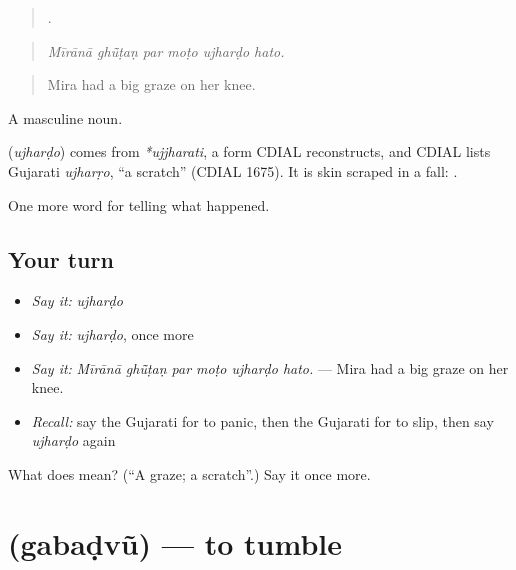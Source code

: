 \begin{quote}
     .
\end{quote}

\begin{quote}
\emph{Mīrānā ghū̃ṭaṇ par moṭo ujharḍo hato.}
\end{quote}

\begin{quote}
Mira had a big graze on her knee.
\end{quote}

A masculine noun.

\begin{cousinweb}
\textbf{} (\emph{ujharḍo}) comes from \emph{*ujjharati}, a form CDIAL reconstructs, and CDIAL lists Gujarati \emph{ujharṛo}, \textquotedblleft{}a scratch\textquotedblright{} (CDIAL 1675). It is skin scraped in a fall: \textbf{  }.
\end{cousinweb}

\begin{grammarlens}[title={What you've built}]
One more word for telling what happened.
\end{grammarlens}

\subsection*{Your turn}
\begin{itemize}
\raggedright
  \item \emph{Say it:} \emph{ujharḍo}
  \item \emph{Say it:} \emph{ujharḍo}, once more
  \item \emph{Say it:} \emph{Mīrānā ghū̃ṭaṇ par moṭo ujharḍo hato.} — Mira had a big graze on her knee.
  \item \emph{Recall:} say the Gujarati for to panic, then the Gujarati for to slip, then say \emph{ujharḍo} again
\end{itemize}

\begin{tcolorbox}[breakable,colback=teal!4,colframe=teal!35!black,title={Before you move on}]
What does  mean? (\textquotedblleft{}A graze; a scratch\textquotedblright{}.) Say it once more.
\end{tcolorbox}
\section[\texorpdfstring{\gu{ગબડવું} (gabaḍvũ)}{ગબડવું (gabaḍvũ)}]{ (gabaḍvũ) — to tumble}

